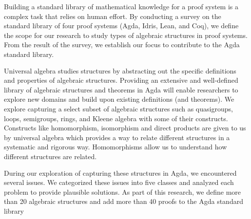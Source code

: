 Building a standard library of mathematical knowledge for a proof system is a
complex task that relies on human effort. By conducting a survey on the standard library
of four proof systems (Agda, Idris, Lean, and Coq), we define the scope for our
research to study types of algebraic structures in proof systems. From the
result of the survey, we establish our focus to contribute to the Agda standard
library. 

Universal algebra studies structures by abstracting out the specific definitions
and properties of algebraic structures. Providing an extensive and well-defined
library of algebraic structures and theorems in Agda will enable researchers to
explore new domains and build upon existing definitions (and theorems). We
explore capturing a select subset of algebraic structures such as quasigroups,
loops, semigroups, rings, and Kleene algebra with some of their constructs.
Constructs like homomorphism, isomorphism and direct products are given to us by
universal algebra which provides a way to relate different structures in a
systematic and rigorous way. Homomorphisms allow us to understand how different
structures are related.

During our exploration of capturing these structures in Agda, we encountered
several issues. We categorized these issues into five classes and analyzed each
problem to provide plausible solutions. As part
of this research, we define more than 20 algebraic structures and add more than
40 proofs to the Agda standard library